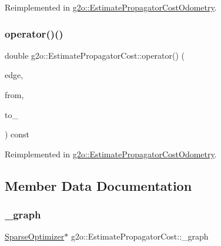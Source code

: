 Reimplemented in \mbox{\hyperlink{classg2o_1_1_estimate_propagator_cost_odometry_a6e610e7413e8973453943c5b4b9423aa}{g2o\+::\+Estimate\+Propagator\+Cost\+Odometry}}.

\mbox{\label{classg2o_1_1_estimate_propagator_cost_a1234b3b82be9b8448cc62b18625adfa6}} 
\subsubsection{\texorpdfstring{operator()()}{operator()()}}
{\footnotesize\ttfamily double g2o\+::\+Estimate\+Propagator\+Cost\+::operator() (\begin{DoxyParamCaption}\item[{\mbox{\hyperlink{classg2o_1_1_optimizable_graph_1_1_edge}{Optimizable\+Graph\+::\+Edge}} $\ast$}]{edge,  }\item[{const \mbox{\hyperlink{classg2o_1_1_hyper_graph_a703938cdb4bb636860eed55a2489d70c}{Optimizable\+Graph\+::\+Vertex\+Set}} \&}]{from,  }\item[{\mbox{\hyperlink{classg2o_1_1_optimizable_graph_1_1_vertex}{Optimizable\+Graph\+::\+Vertex}} $\ast$}]{to\+\_\+ }\end{DoxyParamCaption}) const\hspace{0.3cm}{\ttfamily [virtual]}}



Reimplemented in \mbox{\hyperlink{classg2o_1_1_estimate_propagator_cost_odometry_a3da1f1d67f717d0dbc0077db1c571146}{g2o\+::\+Estimate\+Propagator\+Cost\+Odometry}}.



\subsection{Member Data Documentation}
\mbox{\label{classg2o_1_1_estimate_propagator_cost_adf778ed8de5b54eb934e88107fe77980}} 
\subsubsection{\texorpdfstring{\+\_\+graph}{\_graph}}
{\footnotesize\ttfamily \mbox{\hyperlink{classg2o_1_1_sparse_optimizer}{Sparse\+Optimizer}}$\ast$ g2o\+::\+Estimate\+Propagator\+Cost\+::\+\_\+graph\hspace{0.3cm}{\ttfamily [protected]}}



